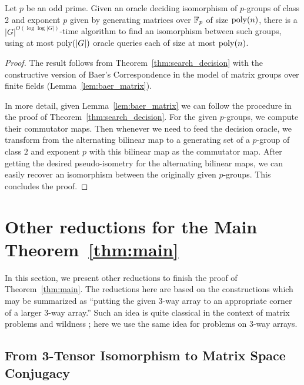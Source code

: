 \documentclass[11pt]{article}
\begin{document}
\begin{corsearch}
Let $p$ be an odd prime. Given an oracle deciding isomorphism 
of $p$-groups of class 2 and exponent $p$ given by generating 
matrices over $\mathbb{F}_p$
of size $\mathrm{poly}(n)$, there is a $|G|^{O(\log \log |G|)}$-time 
algorithm to find an isomorphism between such groups, using at 
most $\mathrm{poly}(|G|)$ oracle queries each of size at most 
$\mathrm{poly}(n)$.
\end{corsearch}

\begin{proof}
The result follows from 
Theorem~\ref{thm:search_decision} with 
the constructive version of Baer's 
Correspondence in the model of matrix groups over finite 
fields (Lemma~\ref{lem:baer_matrix}). 

In more detail, given Lemma~\ref{lem:baer_matrix} 
we can follow the procedure 
in the proof of Theorem~\ref{thm:search_decision}. For the 
given $p$-groups, we compute their commutator maps. Then 
whenever 
we need to feed the decision oracle, we transform from the 
alternating bilinear map to a generating set of a $p$-group of 
class $2$ and exponent $p$ with this bilinear map as the 
commutator map. After getting the desired pseudo-isometry for 
the alternating bilinear maps, we can easily recover an 
isomorphism between the originally given $p$-groups. This 
concludes the proof.
\end{proof}


\section{Other reductions for the Main Theorem~\ref{thm:main}}\label{sec:reduction_other}

In this section, we present other reductions to finish the proof of 
Theorem~\ref{thm:main}. The reductions here are based on the constructions 
which may be summarized as ``putting the given 3-way array to an appropriate 
corner of a larger 3-way array.'' Such an idea is quite classical in the 
context of matrix problems and wildness \cite{gel-pon}; 
here we use the same idea for problems on 3-way arrays. 

\subsection{From 3-Tensor Isomorphism to Matrix Space Conjugacy}
\end{document}

